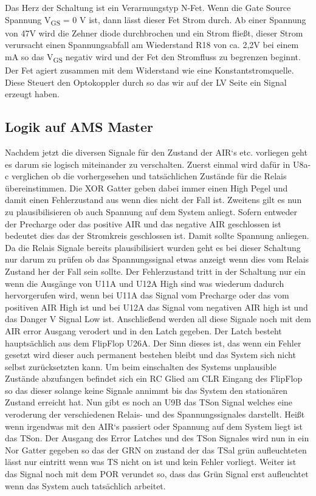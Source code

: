 Das Herz der Schaltung ist ein Verarmungstyp N-Fet. Wenn die Gate Source Spannung V\textsubscript{GS} = 0 V ist, dann lässt dieser Fet Strom durch. Ab einer Spannung von 47V wird die Zehner diode durchbrochen und ein Strom fließt, dieser Strom verursacht einen Spannungsabfall am Wiederstand R18 von ca. 2,2V bei einem mA so das V\textsubscript{GS} negativ wird und der Fet den Stromfluss zu begrenzen beginnt. Der Fet agiert zusammen mit dem Widerstand wie eine Konstantstromquelle. Diese Steuert den Optokoppler durch so das wir auf der LV Seite ein Signal erzeugt haben.

\FloatBarrier
\subsection{Logik auf AMS Master}

Nachdem jetzt die diversen Signale für den Zustand der AIR`s etc. vorliegen geht es darum sie logisch miteinander zu verschalten. Zuerst einmal wird dafür in U8a-c verglichen ob die vorhergesehen und tatsächlichen Zustände für die Relais übereinstimmen. Die XOR Gatter geben dabei immer einen High Pegel und damit einen Fehlerzustand aus wenn dies nicht der Fall ist. Zweitens gilt es nun zu plausibilisieren ob auch Spannung auf dem System anliegt. Sofern entweder der Precharge oder das positive AIR und das negative AIR geschlossen ist bedeutet dies das der Stromkreis geschlossen ist. Damit sollte Spannung anliegen. Da die Relais Signale bereits plausibilisiert wurden geht es bei dieser Schaltung nur darum zu prüfen ob das Spannungssignal etwas anzeigt wenn dies vom Relais Zustand her der Fall sein sollte. Der Fehlerzustand tritt in der Schaltung nur ein wenn die Ausgänge von U11A und U12A High sind was wiederum dadurch hervorgerufen wird, wenn bei U11A das Signal vom Precharge oder das vom positiven AIR High ist und bei U12A das Signal vom negativen AIR high ist und das Danger V Signal Low ist. Anschließend werden all diese Signale noch mit dem AIR error Ausgang verodert und in den Latch gegeben. Der Latch besteht hauptsächlich aus dem FlipFlop U26A. Der Sinn dieses ist, das wenn ein Fehler gesetzt wird dieser auch permanent bestehen bleibt und das System sich nicht selbst zurücksetzten kann. Um beim einschalten des Systems unplausible Zustände abzufangen befindet sich ein RC Glied am CLR Eingang des FlipFlop so das dieser solange keine Signale annimmt bis das System den stationären Zustand erreicht hat. Nun gibt es noch an U9B das TSon Signal welches eine veroderung der verschiedenen Relais- und des Spannungssignales darstellt. Heißt wenn irgendwas mit den AIR`s passiert oder Spannung auf dem System liegt ist das TSon. Der Ausgang des Error Latches und des TSon Signales wird nun in ein Nor Gatter gegeben so das der GRN on zustand der das TSal grün aufleuchteten lässt nur eintritt wenn was TS nicht on ist und kein Fehler vorliegt. Weiter ist das Signal noch mit dem POR verundet so, dass das Grün Signal erst aufleuchtet wenn das System auch tatsächlich arbeitet.

